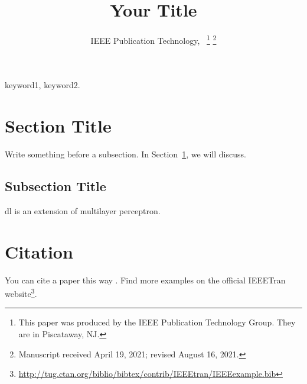 \documentclass[lettersize,journal]{IEEEtran}
\begin{document}
\title{Your Title}

\author{IEEE Publication Technology,~
\thanks{This paper was produced by the IEEE Publication Technology Group. They are in Piscataway, NJ.}%
\thanks{Manuscript received April 19, 2021; revised August 16, 2021.}}

\maketitle


\begin{abstract}
\boldmath 
\lipsum[1]
\end{abstract}

\begin{IEEEkeywords}
keyword1, keyword2.
\end{IEEEkeywords}


\section{Section Title}
\label{sec:title}

Write something before a subsection. 
In Section~\ref{sec:title}, we will discuss. 

\subsection{Subsection Title}
\label{sec:sub:title}

\Gls{dl} is an extension of multilayer perceptron.

\lipsum[1-2]


\section{Citation}
\label{sec:citation}

You can cite a paper this way \cite{lecun2015deep}. 
Find more examples on the official IEEETran website\footnote{\url{http://tug.ctan.org/biblio/bibtex/contrib/IEEEtran/IEEEexample.bib}}.  
\end{document}
